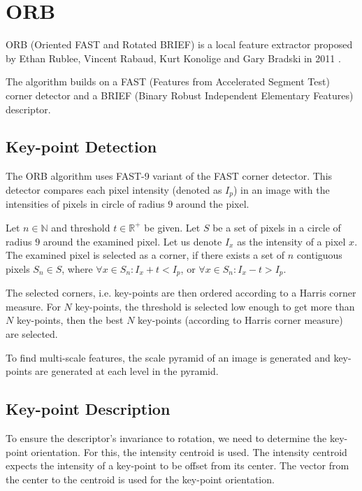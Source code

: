 \section{ORB}
ORB (Oriented FAST and Rotated BRIEF) is a local feature extractor proposed by Ethan Rublee, Vincent Rabaud, Kurt Konolige and Gary Bradski in 2011 \cite{Rublee2011}.

The algorithm builds on a FAST (Features from Accelerated Segment Test) corner detector\cite{Rosten2006} and a BRIEF (Binary Robust Independent Elementary Features) descriptor\cite{Calonder2010}.

\subsection{Key-point Detection}
The ORB algorithm uses FAST-9 variant of the FAST corner detector. This detector compares each pixel intensity (denoted as $I_p$) in an image with the intensities of pixels in circle of radius $9$ around the pixel.

Let $n\in\mathbb{N}$ and threshold $t\in\mathbb{R}^{+}$ be given. Let $S$ be a set of pixels in a circle of radius $9$ around the examined pixel. Let us denote $I_x$ as the intensity of a pixel $x$. The examined pixel is selected as a corner, if there exists a set of $n$ contiguous pixels $S_n \in S$, where $\forall x \in S_n: I_x + t < I_p$, or $\forall x \in S_n: I_x - t > I_p$.

The selected corners, i.e. key-points are then ordered according to a Harris corner measure\cite{Harris1988}. For $N$ key-points, the threshold is selected low enough to get more than $N$ key-points, then the best $N$ key-points (according to Harris corner measure) are selected.

To find multi-scale features, the scale pyramid of an image is generated and key-points are generated at each level in the pyramid.

\subsection{Key-point Description}
To ensure the descriptor's invariance to rotation, we need to determine the key-point orientation. For this, the intensity centroid\cite{Rosin1999} is used. The intensity centroid expects the intensity of a key-point to be offset from its center. The vector from the center to the centroid is used for the key-point orientation.

